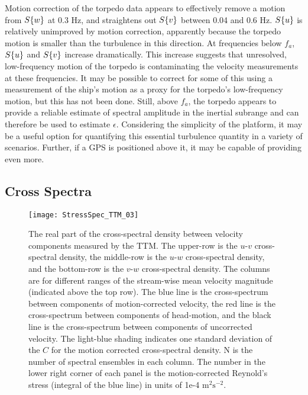 Motion correction of the torpedo data appears to effectively remove a motion from $S\{w\}$ at 0.3 Hz, and straightens out $S\{v\}$ between 0.04 and 0.6 Hz. $S\{u\}$ is relatively unimproved by motion correction, apparently because the torpedo motion is smaller than the turbulence in this direction. At frequencies below $f_a$, $S\{u\}$ and $S\{v\}$ increase dramatically. This increase suggests that unresolved, low-frequency motion of the torpedo is contaminating the velocity measurements at these frequencies. It may be possible to correct for some of this using a measurement of the ship's motion as a proxy for the torpedo's low-frequency motion, but this has not been done. Still, above $f_a$, the torpedo appears to provide a reliable estimate of spectral amplitude in the inertial subrange and can therefore be used to estimate $\epsilon$. Considering the simplicity of the platform, it may be a useful option for quantifying this essential turbulence quantity in a variety of scenarios. Further, if a GPS is positioned above it, it may be capable of providing even more.
%
%


\subsection{Cross Spectra}

\begin{figure*}[t]
  \centering
  \texttt{[image: StressSpec\_TTM\_03]}
  \caption{The real part of the cross-spectral density between velocity components measured by the TTM. The upper-row is the $u$-$v$ cross-spectral density, the middle-row is the $u$-$w$ cross-spectral density, and the bottom-row is the $v$-$w$ cross-spectral density.  The columns are for different ranges of the stream-wise mean velocity magnitude (indicated above the top row). The blue line is the cross-spectrum between components of motion-corrected velocity, the red line is the cross-spectrum between components of head-motion, and the black line is the cross-spectrum between components of uncorrected velocity. The light-blue shading indicates one standard deviation of the $C$ for the motion corrected cross-spectral density. N is the number of spectral ensembles in each column. The number in the lower right corner of each panel is the motion-corrected Reynold's stress (integral of the blue line) in units of 1e-4 $\mathrm{m^2s^{-2}}$.}
  \label{fig:cspec:ttm}
\end{figure*}

